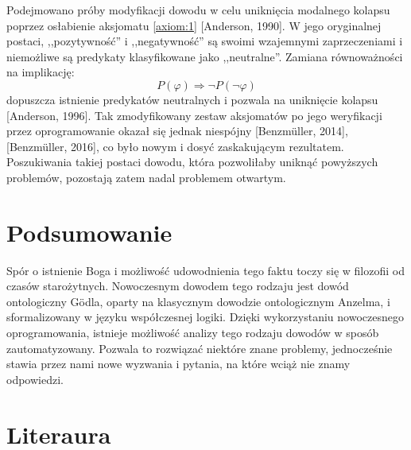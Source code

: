 \documentclass[
    showauthor=true,   %
    showsubject=false, %
    showdate=true,     %
    hyphenation=true   %
]{src/wut-report}
\begin{document}
Podejmowano próby modyfikacji dowodu w celu uniknięcia modalnego kolapsu poprzez osłabienie aksjomatu \ref{axiom:1} [Anderson, 1990]. W jego oryginalnej postaci, ,,pozytywność'' i ,,negatywność'' są swoimi wzajemnymi zaprzeczeniami i niemożliwe są predykaty klasyfikowane jako ,,neutralne''. Zamiana równoważności na implikację:
\begin{equation*}
P(\varphi) \Rightarrow \neg P( \neg \varphi )
\end{equation*}
dopuszcza istnienie predykatów neutralnych i pozwala na uniknięcie kolapsu [Anderson, 1996]. Tak zmodyfikowany zestaw aksjomatów po jego weryfikacji przez oprogramowanie okazał się jednak niespójny [Benzm\"uller, 2014], [Benzm\"uller, 2016], co było nowym i dosyć zaskakującym rezultatem. Poszukiwania takiej postaci dowodu, która pozwoliłaby uniknąć powyższych problemów, pozostają zatem nadal problemem otwartym.

\section{Podsumowanie} \label{sec:summary}
Spór o istnienie Boga i możliwość udowodnienia tego faktu toczy się w filozofii od czasów starożytnych. Nowoczesnym dowodem tego rodzaju jest dowód ontologiczny G\"odla, oparty na klasycznym dowodzie ontologicznym Anzelma, i sformalizowany w języku współczesnej logiki. Dzięki wykorzystaniu nowoczesnego oprogramowania, istnieje możliwość analizy tego rodzaju dowodów w sposób zautomatyzowany. Pozwala to rozwiązać niektóre znane problemy, jednocześnie stawia przez nami nowe wyzwania i pytania, na które wciąż nie znamy odpowiedzi.


\section*{Literaura}
\end{document}
